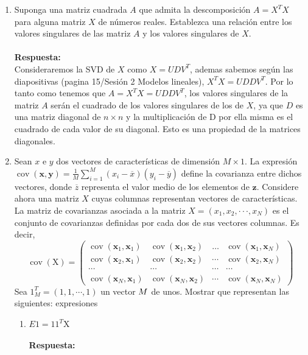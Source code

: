\documentclass[12pt,a4paper]{article}
\begin{document}
\begin{enumerate}
\begin{enumerate}
		\end{enumerate}
	\item Suponga una matriz cuadrada $A$ que admita la descomposición $A = X^TX$ para alguna matriz $X$ de números reales. Establezca una relación entre los valores singulares de las matriz $A$ y los valores singulares de $X$.\\\\\textbf{Respuesta: }\\
	Consideraremos la SVD de $X$ como $X=UDV^T$, ademas sabemos según las diapositivas (pagina 15/Sesión 2 Modelos lineales), $X^TX = UDDV^T$. Por lo tanto como tenemos que $A=X^TX = UDDV^T$, los valores singulares de la matriz $A$ serán el cuadrado de los valores singulares de los de $X$, ya que $D$ es una matriz diagonal de $n \times n$ y la multiplicación de D por ella misma es el cuadrado de cada valor de su diagonal. Esto es una propiedad de la matrices diagonales.
	\item Sean $x$ e $y$ dos vectores de características de dimensión $M \times 1$. La expresión $\operatorname{cov}(\mathbf{x}, \mathbf{y})=\frac{1}{M} \sum_{i=1}^{M}\left(x_{i}-\overline{x}\right)\left(y_{i}-\overline{y}\right)$ define la covarianza entre dichos vectores, donde $\overline{z}$ representa el valor medio de los elementos de $\textbf{z}$. Considere ahora una matriz $X$ cuyas columnas representan vectores de características. La matriz de covarianzas asociada a la matriz $X = (x_1 , x_2 , · · · , x_N )$ es el conjunto de covarianzas definidas por cada dos de sus vectores columnas. Es decir, $$\operatorname{cov}(\mathrm{X})=\left( \begin{array}{cccc}{\operatorname{cov}\left(\mathbf{x}_{1}, \mathbf{x}_{1}\right)} & {\operatorname{cov}\left(\mathbf{x}_{1}, \mathbf{x}_{2}\right)} & {\dots} & {\operatorname{cov}\left(\mathbf{x}_{1}, \mathbf{x}_{N}\right)} \\ {\operatorname{cov}\left(\mathbf{x}_{2}, \mathbf{x}_{1}\right)} & {\operatorname{cov}\left(\mathbf{x}_{2}, \mathbf{x}_{2}\right)} & {\cdots} & {\operatorname{cov}\left(\mathbf{x}_{2}, \mathbf{x}_{N}\right)} \\ {\cdots} & {\cdots} & {\cdots} & {\cdots} \\ {\operatorname{cov}\left(\mathbf{x}_{N}, \mathbf{x}_{1}\right)} & {\operatorname{cov}\left(\mathbf{x}_{N}, \mathbf{x}_{2}\right)} & {\cdots} & {\operatorname{cov}\left(\mathbf{x}_{N}, \mathbf{x}_{N}\right)}\end{array}\right)$$ Sea $1_{M}^{T}=(1,1, \cdots, 1)$ un vector $M \time 1$ de unos. Mostrar que representan las siguientes:
	expresiones
	\begin{enumerate}
		\item  $E 1=11^{T} \mathrm{X}$\\\\
		\textbf{Respuesta:}\\



\end{enumerate}
\end{enumerate}
\end{document}
